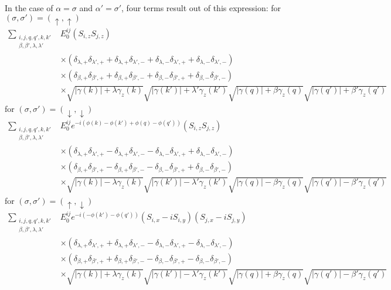 In the case of $\alpha = \sigma$ and $\alpha'=\sigma'$, four terms result out of this expression: \newline
for $(\sigma, \sigma') =(\uparrow, \uparrow)$
\begin{align} \label{eq:spinstruct_a}
   \sum_{\substack{i, j, q,q', k, k'\\ \beta, \beta', \lambda, \lambda'}} &E^{ij}_0 \left(S_{i,z} S_{j,z}\right) \\ \nonumber
   &\times \left( \delta_{\lambda,+}\delta_{\lambda',+} + \delta_{\lambda,+}\delta_{\lambda',-}+ \delta_{\lambda,-}\delta_{\lambda',+}+\delta_{\lambda,-}\delta_{\lambda',-}\right)\\\nonumber
   &\times \left( \delta_{\beta,+}\delta_{\beta',+} + \delta_{\beta,+}\delta_{\beta',-}+ \delta_{\beta,-}\delta_{\beta',+}+\delta_{\beta,-}\delta_{\beta',-}\right)\\\nonumber
   &\times \sqrt{|\gamma(k)|+ \lambda\gamma_z(k)}\sqrt{|\gamma(k')|+ \lambda'\gamma_z(k')}\sqrt{|\gamma(q)|+ \beta\gamma_z(q)}\sqrt{|\gamma(q')|+ \beta'\gamma_z(q')}
\end{align}
for $(\sigma, \sigma') =(\downarrow, \downarrow)$
\begin{align}\label{eq:spinstruct_b}
    \sum_{\substack{i, j, q,q', k, k'\\ \beta, \beta', \lambda, \lambda'}} &E^{ij}_0 e^{-i(\phi(k)-\phi(k')+\phi(q)-\phi(q'))}\left(S_{i,z} S_{j,z}\right) \\ \nonumber
   &\times \left( \delta_{\lambda,+}\delta_{\lambda',+} - \delta_{\lambda,+}\delta_{\lambda',-}- \delta_{\lambda,-}\delta_{\lambda',+}+\delta_{\lambda,-}\delta_{\lambda',-}\right)\\\nonumber
   &\times \left( \delta_{\beta,+}\delta_{\beta',+} - \delta_{\beta,+}\delta_{\beta',-}- \delta_{\beta,-}\delta_{\beta',+}+\delta_{\beta,-}\delta_{\beta',-}\right)\\\nonumber
   &\times \sqrt{|\gamma(k)|-\lambda\gamma_z(k)}\sqrt{|\gamma(k')|-\lambda'\gamma_z(k')}\sqrt{|\gamma(q)|-\beta\gamma_z(q)}\sqrt{|\gamma(q')|-\beta'\gamma_z(q')}
\end{align}
for $(\sigma, \sigma') =(\uparrow, \downarrow)$
\begin{align}
    \sum_{\substack{i, j, q,q', k, k'\\ \beta, \beta', \lambda, \lambda'}} &E^{ij}_0 e^{-i(-\phi(k')-\phi(q'))} \left(S_{i,x}-iS_{i,y}\right) \left( S_{j,x}-iS_{j,y}\right) \\ \nonumber
   &\times \left( \delta_{\lambda,+}\delta_{\lambda',+} + \delta_{\lambda,+}\delta_{\lambda',-}- \delta_{\lambda,-}\delta_{\lambda',+}-\delta_{\lambda,-}\delta_{\lambda',-}\right)\\\nonumber
   &\times \left( \delta_{\beta,+}\delta_{\beta',+} + \delta_{\beta,+}\delta_{\beta',-}- \delta_{\beta,-}\delta_{\beta',+}-\delta_{\beta,-}\delta_{\beta',-}\right)\\\nonumber
   &\times \sqrt{|\gamma(k)|+ \lambda\gamma_z(k)}\sqrt{|\gamma(k')|-\lambda'\gamma_z(k')}\sqrt{|\gamma(q)|+ \beta\gamma_z(q)}\sqrt{|\gamma(q')|-\beta'\gamma_z(q')}
\end{align}
